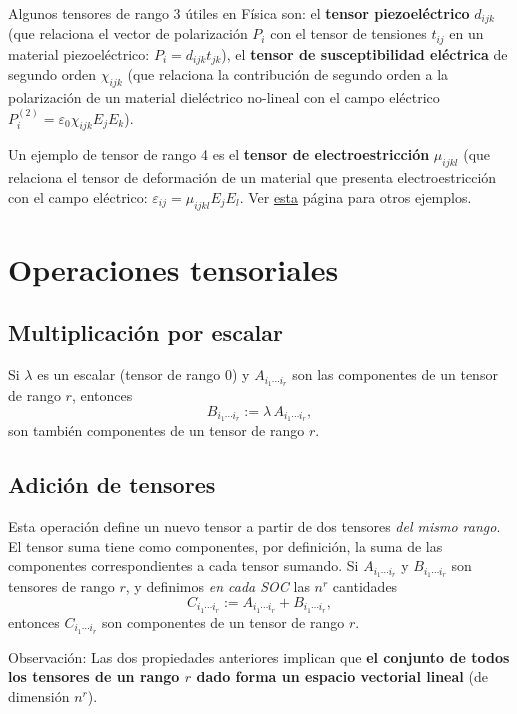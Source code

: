 Algunos tensores de rango 3 útiles en Física son: el \textbf{tensor piezoeléctrico} $d_{ijk}$ (que relaciona el vector de polarización $P_i$ con el tensor de tensiones $t_{ij}$ en un material piezoeléctrico: $P_i=d_{ijk}t_{jk}$), el \textbf{tensor de susceptibilidad eléctrica} de segundo orden $\chi_{ijk}$ (que relaciona la contribución de segundo orden a la polarización de un material dieléctrico no-lineal con el campo eléctrico $P_i^{(2)}=\varepsilon_0\chi_{ijk}E_jE_k$).

Un ejemplo de tensor de rango 4 es el \textbf{tensor de electroestricción} $\mu_{ijkl}$ (que relaciona el tensor de deformación de un material que presenta electroestricción con el campo eléctrico: $\varepsilon_{ij}=\mu_{ijkl}E_jE_l$. Ver \href{http://oldwww.iucr.org/iucr-top/comm/cteach/pamphlets/18/node2.html}{esta} página para otros ejemplos.

\section{Operaciones tensoriales}
\subsection{Multiplicación por escalar}
Si $\lambda$ es un escalar (tensor de rango $0$) y $A_{i_1\cdots i_r}$ son las componentes de un tensor de rango $r$, entonces
\begin{equation}
B_{i_1\cdots i_r}:=\lambda\,A_{i_1\cdots i_r},
\end{equation}
son también componentes de un tensor de rango $r$.

\subsection{Adición de tensores}
Esta operación define un nuevo tensor a partir de dos tensores \textit{del mismo rango}. El tensor suma tiene como componentes, por definición, la suma de las componentes correspondientes a cada tensor sumando. Si $A_{i_1\cdots i_r}$ y $B_{i_1\cdots i_r}$ son tensores de rango $r$, y definimos \textit{en cada SOC} las $n^r$ cantidades
\begin{equation}
C_{i_1\cdots i_r}:=A_{i_1\cdots i_r}+B_{i_1\cdots i_r},
\end{equation}
entonces $C_{i_1\cdots i_r}$ son componentes de un tensor de rango $r$.

Observación: Las dos propiedades anteriores implican que \textbf{el conjunto de todos los tensores de un rango $r$ dado forma un espacio vectorial lineal} (de dimensión $n^r$).

